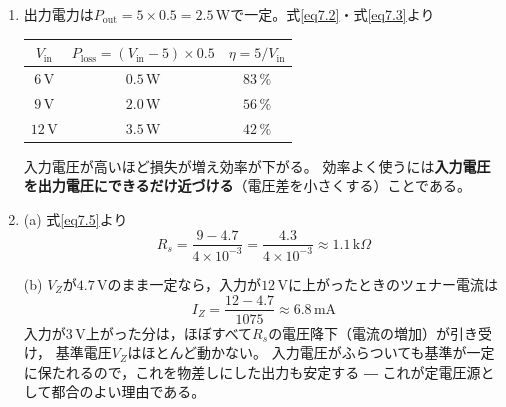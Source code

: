 \answer
\begin{enumerate}

\item[\ref{ex7.1}]
出力電力は$P_{\mathrm{out}} = 5\times0.5 = 2.5$\,Wで一定。式\ref{eq7.2}・式\ref{eq7.3}より
\begin{center}
\begin{tabular}{c|c|c}
\hline
$V_{\mathrm{in}}$ & $P_{\mathrm{loss}}=(V_{\mathrm{in}}-5)\times0.5$ & $\eta=5/V_{\mathrm{in}}$ \\
\hline
$6$\,V & $0.5$\,W & $83\,\%$ \\
$9$\,V & $2.0$\,W & $56\,\%$ \\
$12$\,V & $3.5$\,W & $42\,\%$ \\
\hline
\end{tabular}
\end{center}
入力電圧が高いほど損失が増え効率が下がる。
効率よく使うには\textbf{入力電圧を出力電圧にできるだけ近づける}（電圧差を小さくする）ことである。

\item[\ref{ex7.2}]
(a) 式\ref{eq7.5}より
\begin{equation*}
R_s = \frac{9 - 4.7}{4\times10^{-3}} = \frac{4.3}{4\times10^{-3}} \approx 1.1\,\mathrm{k}\Omega
\end{equation*}

(b) $V_Z$が$4.7$\,Vのまま一定なら，入力が$12$\,Vに上がったときのツェナー電流は
\begin{equation*}
I_Z = \frac{12 - 4.7}{1075} \approx 6.8\,\mathrm{mA}
\end{equation*}
入力が$3$\,V上がった分は，ほぼすべて$R_s$の電圧降下（電流の増加）が引き受け，
基準電圧$V_Z$はほとんど動かない。
入力電圧がふらついても基準が一定に保たれるので，これを物差しにした出力も安定する ―
これが定電圧源として都合のよい理由である。

%


\end{enumerate}
